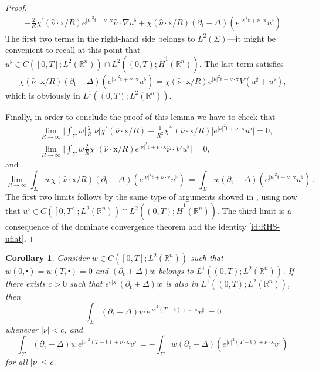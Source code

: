 \documentclass[10pt,a4paper]{amsart}
\newtheorem{corollary}[proposition]{Corollary}
\newcommand{\R}{\mathbb{R}}
\newcommand{\tm}{\mathrm{t}}
\newcommand{\x}{\mathrm{x}}
\begin{document}
\begin{proof}
\begin{align*}
- \frac{2}{R} \chi^\prime (\hat \nu \cdot \x/R) e^{|\nu|^2 \tm + \nu \cdot \x} \hat \nu \cdot \nabla u^\flat
+ \chi(\hat \nu \cdot \x/R) (\partial_{\tm}-\Delta)(e^{|\nu|^2 \tm + \nu \cdot \x} u^\flat)
\end{align*}
The first two terms in the right-hand side belongs to 
$L^2(\Sigma)$---it might be convenient to recall at this point that 
$u^\flat \in C([0, T]; L^2(\R^n))\cap L^2((0,T); \dot H^1(\R^n))$. The last term satisfies
\begin{equation}
\label{id:RHS-uflat}
\chi(\hat \nu \cdot \x/R) (\partial_{\tm}-\Delta)(e^{|\nu|^2 \tm + \nu \cdot \x} u^\flat) = \chi(\hat \nu \cdot \x/R) e^{|\nu|^2 \tm + \nu \cdot \x} V (u^\sharp + u^\flat),
\end{equation}
which is obviously in $L^1((0,T); L^2(\R^n))$.

Finally, in order to conclude the proof of this lemma we have to check
that
\begin{align*}
& \lim_{R\to \infty} \Big| \int_{\Sigma} w \Big[\frac{2}{R} |\nu| \chi^\prime (\hat \nu \cdot \x/R) + \frac{1}{R^2} \chi^{\prime \prime} (\hat \nu \cdot \x/R) \Big] e^{|\nu|^2 \tm + \nu \cdot \x} u^\flat \Big| = 0,\\
& \lim_{R\to \infty} \Big| \int_{\Sigma} w \frac{2}{R} \chi^\prime (\hat \nu \cdot \x/R) e^{|\nu|^2 \tm + \nu \cdot \x} \hat \nu \cdot \nabla u^\flat \Big| = 0,
\end{align*}
and
\[\lim_{R\to \infty} \int_{\Sigma} w \chi(\hat \nu \cdot \x/R) (\partial_{\tm}-\Delta)(e^{|\nu|^2 \tm + \nu \cdot \x} u^\flat) \, = \int_{\Sigma} w (\partial_{\tm}-\Delta)(e^{|\nu|^2 \tm + \nu \cdot \x} u^\flat) \, .  \]
The first two limits follows by the same type of arguments showed in , using 
now that $u^\flat \in C([0, T]; L^2(\R^n))\cap L^2((0,T); \dot H^1(\R^n))$.
The third limit is a consequence of the dominate convergence theorem and the identity 
\eqref{id:RHS-uflat}.
\end{proof}

\begin{corollary}\label{cor:vsharp-vflat}\sl
Consider $w \in C([0, T] ; L^{2}(\mathbb{R}^{n}))$ such that 
$w (0, \centerdot) = w(T, \centerdot)=0$ 
and $(\partial_{\tm}+\Delta)w $ belongs to $ L^{1}((0, T) ; L^{2}(\mathbb{R}^{n}))$.
If there exists $c > 0$ such that 
$e^{c|\x|} (\partial_{\tm}+\Delta)w $ is also in $ L^{1}((0, T) ; L^{2}(\mathbb{R}^{n}))$, then
\[ \int_{\Sigma}( \partial_{\tm}-\Delta) w \, e^{|\nu|^2 (T - \tm) + \nu \cdot \x} v^\sharp \, = 0 \]
whenever $|\nu| < c$, and
\[ \int_{\Sigma}( \partial_{\tm}-\Delta) w \, e^{|\nu|^2 (T - \tm) + \nu \cdot \x} v^\flat \, = - \int_{\Sigma} w ( \partial_{\tm}+\Delta)(e^{|\nu|^2 (T - \tm) + \nu \cdot \x} v^\flat) \, \]
for all $|\nu| \leq c$.
\end{corollary}
\end{document}
